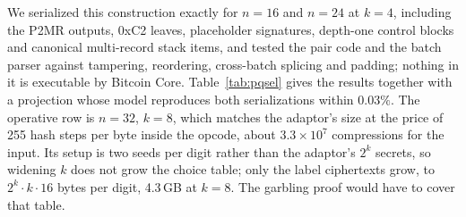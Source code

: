 \documentclass[11pt]{article}
\begin{document}
We serialized this construction exactly for $n=16$ and
$n=24$ at $k=4$, including the P2MR outputs, 0xC2 leaves, placeholder
signatures, depth-one control blocks and canonical multi-record stack items,
and tested the pair code and the batch parser against tampering, reordering,
cross-batch splicing and padding; nothing in it is executable by Bitcoin Core.
Table~\ref{tab:pqsel} gives the results together with a projection whose model
reproduces both serializations within $0.03\%$. The operative row is
$n=32$, $k=8$, which matches the adaptor's size at the price of 255 hash steps per
byte inside the opcode, about $3.3\times10^7$ compressions for the input. Its setup is two seeds per digit rather than the adaptor's $2^k$
secrets, so widening $k$ does not grow the choice table; only the label ciphertexts grow, to $2^k\cdot k\cdot 16$ bytes per digit, 4.3\,GB at
$k=8$. The garbling proof would have to cover that table.
\end{document}
